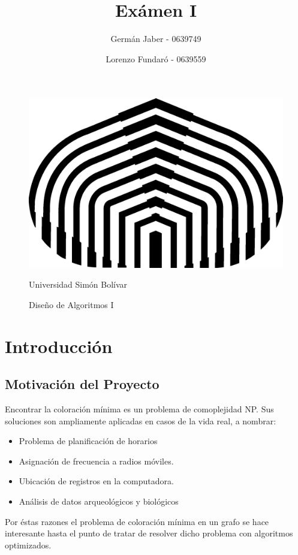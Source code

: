 \documentclass[a4paper,10pt]{article}
\title{Exámen I}
\author{Germán Jaber - 0639749}
\author{Lorenzo Fundar\'o - 0639559}
\begin{document}
\begin{figure}[t]
\begin{center}
\includegraphics[scale = 0.75]{usb.png}
\end{center}
\begin{center}
\large Universidad Simón Bolívar
\end{center}
\begin{center}
 \large Diseño de Algoritmos I
\end{center}


\end{figure}


\maketitle


\thispagestyle{empty}
\newpage

\tableofcontents{}
\newpage


\section{Introducción}

\subsection{Motivación del Proyecto}
Encontrar la coloración mínima es un problema de comoplejidad NP. 
Sus soluciones son ampliamente aplicadas en casos de la vida real, a nombrar:
\begin{itemize}
 \item Problema de planificación de horarios
 \item Asignación de frecuencia a radios móviles.
 \item Ubicación de registros en la computadora.
 \item Análisis de datos arqueológicos y biológicos
\end{itemize}
Por éstas razones el problema de coloración mínima en un grafo se hace 
interesante hasta el punto de tratar de resolver dicho problema con 
algoritmos optimizados.
\end{document}
